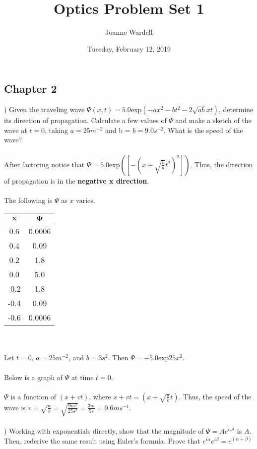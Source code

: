 \documentclass[12pt]{article}
\title{\vspace{-2.0cm}Optics Problem Set 1}
\author{Joanne Wardell}
\date{Tuesday, February 12, 2019}
\begin{document}
\maketitle

\subsection*{Chapter 2}

) Given the traveling wave $\Psi(x,t) = 5.0$exp$(-ax^{2}-bt^{2}-
2\sqrt{ab}xt)$, determine its direction of propagation. Calculate a few 
values of $\Psi$ and make a sketch of the wave at $t = 0$, taking $a = 25m^{-2}$ and 
b = $b = 9.0s^{-2}$. What is the speed of the wave?\\\\
\noindent After factoring notice that 
$\Psi = 5.0$exp$([-(x+\sqrt{\frac{b}{a}}t^{2})^{2}])$. Thus, the direction 
of propagation is in the \textbf{negative x direction}.\\\\
The following is $\Psi$ as $x$ varies.\\
\begin{tabular}{c|c}
  $\mathbf{x}$ & $\mathbf{\Psi}$ \\ \hline
  0.6 & 0.0006\\
  0.4 & 0.09\\
  0.2 & 1.8\\
  0.0 & 5.0\\
  -0.2 & 1.8\\
  -0.4 & 0.09\\
  -0.6 & 0.0006\\
\end{tabular} \\\\

\noindent Let $t = 0$, $a = 25m^{-2}$, and $b = 3s^{2}$. Then 
$\Psi = -5.0$exp$25x^{2}$.\\\\
\noindent Below is a graph of $\Psi$ at time $t = 0$.\\\\


\noindent $\Psi$ is a function of $(x + vt)$, where $x + vt = (x + \sqrt{\frac{a}{b}}t)$. 
Thus, the speed of the wave is $v = \sqrt{\frac{a}{b}} = \sqrt{\frac{9m^{2}}{25s^{2}}} 
= \frac{3m}{5s} = 0.6ms^{-1}$.\\\\

) Working with exponentials directly, show that the magnitude of 
$\Psi = Ae^{i\omega t}$ is $A$. Then, rederive the same result using Euler's formula. 
Prove that $e^{i\alpha}e^{i\beta} = e^{(\alpha + \beta)}$\\\\
\end{document}

